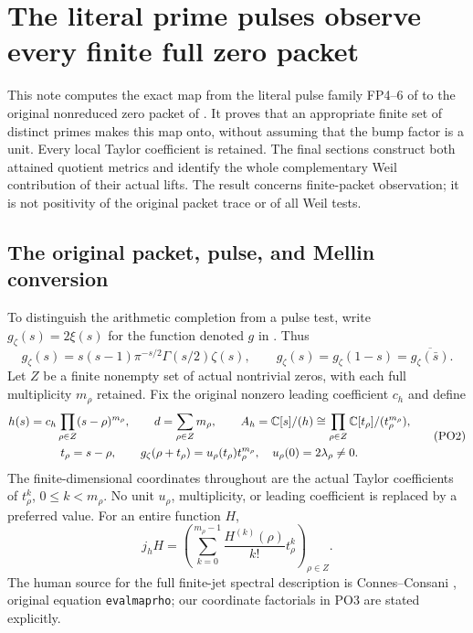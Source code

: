 \section{The literal prime pulses observe every finite full zero packet}



This note computes the exact map from the literal pulse family
FP4--6 of \cite{PO:FP} to the original nonreduced zero packet of
\cite{PO:PL}. It proves that an appropriate finite set of distinct
primes makes this map onto, without assuming that the bump factor
is a unit. Every local Taylor coefficient is retained. The final
sections construct both attained quotient metrics and identify the
whole complementary Weil contribution of their actual lifts.
The result concerns finite-packet observation; it is not positivity
of the original packet trace or of all Weil tests.

\subsection{The original packet, pulse, and Mellin conversion}

To distinguish the arithmetic completion from a pulse test, write
\(g_\zeta(s)=2\xi(s)\) for the function denoted \(g\) in \cite{PO:PL}.
Thus
\[
 g_\zeta(s)=s(s-1)\pi^{-s/2}\Gamma(s/2)\zeta(s),
 \qquad g_\zeta(s)=g_\zeta(1-s)
               =\overline{g_\zeta(\bar s)}.
 \tag{PO1}
\]
Let \(Z\) be a finite nonempty set of actual nontrivial zeros,
with each full multiplicity \(m_\rho\) retained. Fix the original
nonzero leading coefficient \(c_h\) and define
\[
 \begin{gathered}
 h(s)=c_h\prod_{\rho\in Z}(s-\rho)^{m_\rho},\qquad
 d=\sum_{\rho\in Z}m_\rho,\qquad
 A_h=\mathbb C[s]/(h)\cong\prod_{\rho\in Z}\mathbb C[t_\rho]/(t_\rho^{m_\rho}),\\
 t_\rho=s-\rho,\qquad
 g_\zeta(\rho+t_\rho)=u_\rho(t_\rho)t_\rho^{m_\rho},
 \quad u_\rho(0)=2\lambda_\rho\ne0 .
 \end{gathered}
 \tag{PO2}\label{PO:po:packet}
\]
The finite-dimensional coordinates throughout are the actual
Taylor coefficients of \(t_\rho^k\), \(0\le k<m_\rho\).
No unit \(u_\rho\), multiplicity, or leading coefficient is
replaced by a preferred value. For an entire function \(H\),
\[
 j_hH=\left(\sum_{k=0}^{m_\rho-1}
                    \frac{H^{(k)}(\rho)}{k!}t_\rho^k\right)_{\rho\in Z}.
 \tag{PO3}\label{PO:po:jet}
\]
The human source for the full finite-jet spectral description is
Connes--Consani \cite{PO:CC}, original equation \texttt{evalmaprho};
our coordinate factorials in PO3 are stated explicitly.


